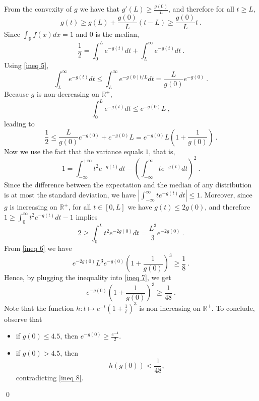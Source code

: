 \documentclass[10pt,a4paper]{amsart}
\newcommand{\R}{\mathbb{R}}
\newenvironment{proof}{\par\noindent{\bf Proof:}}{\qed \par\medskip\noindent}
\begin{document}
\begin{proof}
From the convexity of $g$ we have that $g'(L)\geq \frac{g(0)}{L}$, and
therefore  for all $t \geq L$, 
\begin{equation}\label{ineq 5}
g(t)\geq g(L)+\frac{g(0)}{L}(t-L)\geq \frac{g(0)}{L}t~.
\end{equation}
Since $\int_{\R} f(x) dx =1$ and $0$ is the median,
\[
  \frac{1}{2}=\int_0^L e^{-g(t)}dt+\int_L^{\infty} e^{-g(t)}dt~.
\]
Using \eqref{ineq 5},
\[
  \int_L^{\infty} e^{-g(t)}dt \leq \int_L^{\infty}
  e^{-g(0)t/L}dt=\frac{L}{g(0)}e^{-g(0)}~.
\]
Because $g$ is non-decreasing on $\R^+$, 
\[
  \int_0^L e^{-g(t)}dt \leq e^{-g(0)}L~,
\]  
leading to
\begin{equation}\label{ineq 6}
\frac{1}{2} \leq \frac{L}{g(0)}e^{-g(0)}+e^{-g(0)}L=e^{-g(0)}L\left(1+\frac{1}{g(0)}\right)~.
\end{equation}
Now we use the fact that the variance equals $1$, that is,
\[
  1=\int_{-\infty}^{+\infty}t^2e^{-g(t)}dt -
  \left(\int_{-\infty}^{\infty}t e^{-g(t)}dt\right)^2~.
\]
Since the difference between the expectation and the median of any
distribution is at most the standard deviation, we have
$|\int_{-\infty}^{\infty}t e^{-g(t)}dt|\le 1$.
Moreover,  since $g$ is increasing on $\R^+$, for all $t \in [0,L]$ we
have $g(t)\leq 2g(0)$, and therefore $1 \geq
\int_0^{\infty}t^2e^{-g(t)}dt -1$
implies
\begin{equation}\label{ineq 7}
2 \geq \int_0^L t^2 e^{-2g(0)}dt = \frac{L^3}{3}e^{-2g(0)}~.
\end{equation}
From \eqref{ineq 6} we have
\[
  e^{-2g(0)}L^3  e^{-g(0)}\left(1+\frac{1}{g(0)}\right)^3 \geq
  \frac{1}{8}~.
\]
Hence, by plugging the inequality into \eqref{ineq 7}, we get
\begin{equation}\label{ineq 8}
e^{-g(0)}\left(1+\frac{1}{g(0)}\right)^3 \geq \frac{1}{48}~.
\end{equation}
Note that the function $h:t \mapsto e^{-t}\left(1+\frac{1}{t}\right)^3$
is non increasing on $\R^+ $.
To conclude, observe that
\begin{itemize}
\item if $g(0)\leq 4.5$, then $e^{-g(0)}\geq \frac{e^{-4}}{2}$.
\item if $g(0)>4.5$, then
$$ h(g(0)) < \frac{1}{48},$$
contradicting \eqref{ineq 8}.
\end{itemize}
\end{proof}
\end{document}
